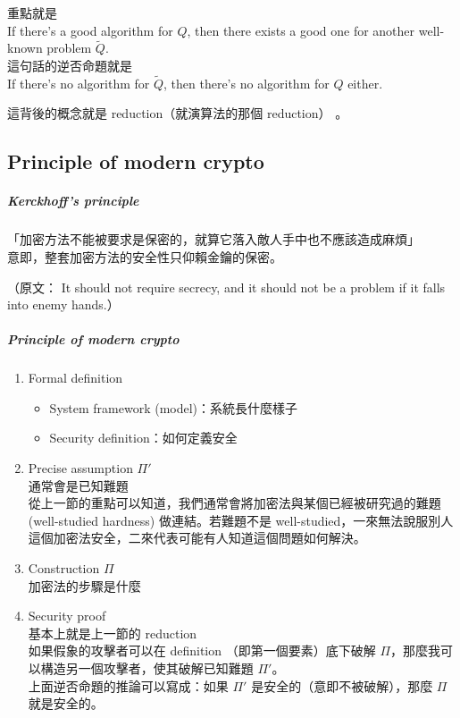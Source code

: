 重點就是 \\
If there's a good algorithm for \(Q\), then there exists a good one for another well-known problem \(\widetilde{Q}\). \\
這句話的逆否命題就是 \\
If there's no algorithm for \(\widetilde{Q}\), then there's no algorithm for \(Q\) either.

這背後的概念就是 reduction（就演算法的那個 reduction） 。


\subsection{Principle of modern crypto}

\subparagraph{Kerckhoff's principle}
「加密方法不能被要求是保密的，就算它落入敵人手中也不應該造成麻煩」 \\
意即，整套加密方法的安全性只仰賴金鑰的保密。

（原文： It should not require secrecy, and it should not be a problem if it falls into enemy hands.）

\subparagraph{Principle of modern crypto}
\begin{enumerate}[itemsep=10pt]
	\item Formal definition
		\begin{itemize}
			\item System framework (model)：系統長什麼樣子
			\item Security definition：如何定義安全
		\end{itemize}
	\item Precise assumption \qquad \(\Pi'\)\\
		通常會是已知難題 \\
		從上一節的重點可以知道，我們通常會將加密法與某個已經被研究過的難題 (well-studied hardness) 做連結。若難題不是 well-studied，一來無法說服別人這個加密法安全，二來代表可能有人知道這個問題如何解決。
	\item Construction \qquad \(\Pi\)\\
		加密法的步驟是什麼
	\item Security proof \\
		基本上就是上一節的 reduction \\
		如果假象的攻擊者可以在 definition （即第一個要素）底下破解 \(\Pi\)，那麼我可以構造另一個攻擊者，使其破解已知難題 \(\Pi'\)。 \\
		上面逆否命題的推論可以寫成：如果 \(\Pi'\) 是安全的（意即不被破解），那麼 \(\Pi\) 就是安全的。
\end{enumerate}

